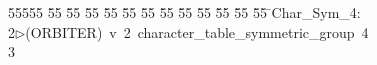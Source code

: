 %
%
\begin{tabbing}
55555 \= 55 \= 55 \= 55 \= 55 \= 55 \= 55 \= 55 \= 55 \= 55 \= 55 \= 55 \= 55 \= \>Char\_Sym\_4:\\[0pt]
2\>$\triangleright$\>(ORBITER)\ v\ 2\ character\_table\_symmetric\_group\ 4\\[0pt]
3\>\end{tabbing}
